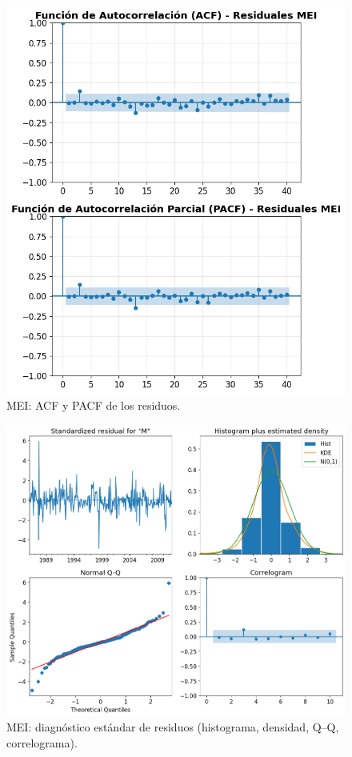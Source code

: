 \begin{figure}[H]\centering
\includegraphics[scale=.52]{Figures/acf_pacf_res_mei.png}
\caption{MEI: ACF y PACF de los residuos.}
\label{fig:acf_pacf_res_mei}
\end{figure}

\begin{figure}[H]\centering
\includegraphics[scale=.52]{Figures/res_std_mei.png}
\caption{MEI: diagnóstico estándar de residuos (histograma, densidad, Q--Q, correlograma).}
\label{fig:std_mei}
\end{figure}

